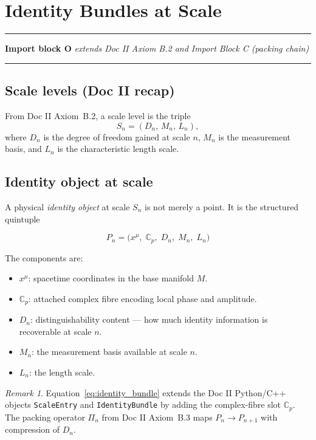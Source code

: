 \documentclass[11pt, a4paper, oneside]{article}
\theoremstyle{definition}
\theoremstyle{plain}
\theoremstyle{remark}
\newtheorem{remark}{Remark}[section]
\newcommand{\Sn}{S_n}
\newcommand{\Cp}{\mathbb{C}_p}
\begin{document}
\section{Identity Bundles at Scale}
\label{sec:identity_bundle}

\noindent\rule{\linewidth}{0.8pt}
\textbf{Import block O} \hfill
  \textit{extends Doc II Axiom B.2 and Import Block C (packing chain)}
\noindent\rule{\linewidth}{0.4pt}

\subsection{Scale levels (Doc II recap)}

From Doc II Axiom~B.2, a scale level is the triple
\begin{equation}
  \Sn = (D_n,\, M_n,\, L_n),
  \label{eq:scale_level}
\end{equation}
where $D_n$ is the degree of freedom gained at scale $n$,
$M_n$ is the measurement basis, and $L_n$ is the characteristic
length scale.

\subsection{Identity object at scale}

A physical \emph{identity object} at scale $S_n$ is not merely a point.
It is the structured quintuple

\begin{equation}
  \boxed{P_n = \bigl(x^\mu,\; \Cp,\; D_n,\; M_n,\; L_n\bigr)}
  \label{eq:identity_bundle}
\end{equation}

The components are:
\begin{itemize}
  \item $x^\mu$: spacetime coordinates in the base manifold $M$.
  \item $\Cp$: attached complex fibre encoding local phase and amplitude.
  \item $D_n$: distinguishability content — how much identity information
    is recoverable at scale $n$.
  \item $M_n$: the measurement basis available at scale $n$.
  \item $L_n$: the length scale.
\end{itemize}

\begin{remark}
  Equation~\eqref{eq:identity_bundle} extends the Doc II Python/C++ objects
  \texttt{ScaleEntry} and \texttt{IdentityBundle} by adding the complex-fibre
  slot $\Cp$.
  The packing operator $\Pi_n$ from Doc II Axiom~B.3 maps
  $P_n \to P_{n+1}$ with compression of $D_n$.
\end{remark}
\end{document}
